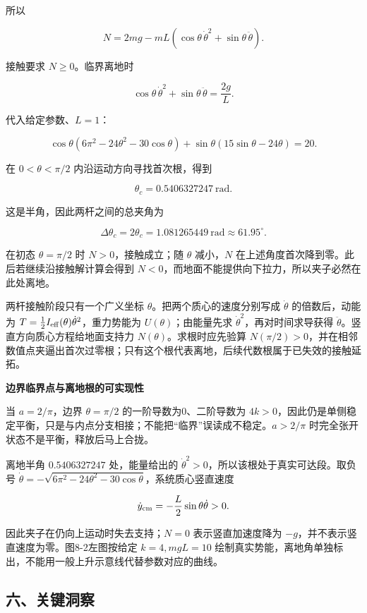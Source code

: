 \documentclass[12pt,a4paper,UTF8]{ctexart}
\begin{document}
所以

\[\boxed{
N=2mg-mL\left(
\cos\theta\,\dot\theta^2+\sin\theta\,\ddot\theta
\right)
}.\]

接触要求 \(N\ge0\)。临界离地时

\[\boxed{
\cos\theta\,\dot\theta^2+\sin\theta\,\ddot\theta
=\frac{2g}{L}
}.\]

代入给定参数、\(L=1\)：

\[\cos\theta(6\pi^2-24\theta^2-30\cos\theta)
+\sin\theta(15\sin\theta-24\theta)=20.\]

在 \(0<\theta<\pi/2\) 内沿运动方向寻找首次根，得到

\[\boxed{\theta_c=0.5406327247\ \mathrm{rad}}.\]

这是半角，因此两杆之间的总夹角为

\[\boxed{
\Delta\theta_c=2\theta_c
=1.081265449\ \mathrm{rad}
\approx61.95^\circ
}.\]

在初态 \(\theta=\pi/2\) 时 \(N>0\)，接触成立；随 \(\theta\) 减小，\(N\)
在上述角度首次降到零。此后若继续沿接触解计算会得到
\(N<0\)，而地面不能提供向下拉力，所以夹子必然在此处离地。

两杆接触阶段只有一个广义坐标 \(\theta\)。把两个质心的速度分别写成
\(\dot\theta\) 的倍数后，动能为
\(T=\tfrac12I_{\rm eff}(\theta)\dot\theta^2\)，重力势能为
\(U(\theta)\)；由能量先求 \(\dot\theta^2\)，再对时间求导获得
\(\ddot\theta\)。竖直方向质心方程给地面支持力
\(N(\theta)\)。求根时应先验算
\(N(\pi/2)>0\)，并在相邻数值点夹逼出首次过零根；只有这个根代表离地，后续代数根属于已失效的接触延拓。

\textbf{边界临界点与离地根的可实现性}

当 \(a=2/\pi\)，边界 \(\theta=\pi/2\) 的一阶导数为0、二阶导数为
\(4k>0\)，因此仍是单侧稳定平衡，只是与内点分支相接；不能把``临界''误读成不稳定。\(a>2/\pi\)
时完全张开状态不是平衡，释放后马上合拢。

离地半角 \(0.5406327247\) 处，能量给出的
\(\dot\theta^2>0\)，所以该根处于真实可达段。取负号
\(\dot\theta=-\sqrt{6\pi^2-24\theta^2-30\cos\theta}\)，系统质心竖直速度

\[\dot y_{\rm cm}=-\frac L2\sin\theta\dot\theta>0.\]

因此夹子在仍向上运动时失去支持；\(N=0\) 表示竖直加速度降为
\(-g\)，并不表示竖直速度为零。图8-2左图按给定 \(k=4,mgL=10\)
绘制真实势能，离地角单独标出，不能用一般上升示意线代替参数对应的曲线。

\subsection{六、关键洞察}\label{ux516dux5173ux952eux6d1eux5bdf-7}
\end{document}
